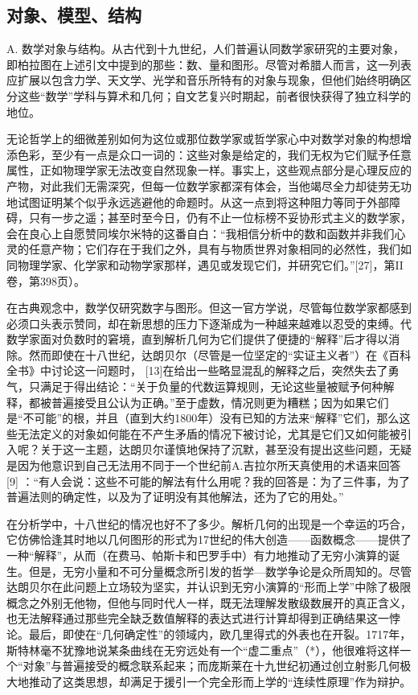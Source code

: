 \subsection*{对象、模型、结构}

A. 数学对象与结构。从古代到十九世纪，人们普遍认同数学家研究的主要对象，即柏拉图在上述引文中提到的那些：数、量和图形。尽管对希腊人而言，这一列表应扩展以包含力学、天文学、光学和音乐所特有的对象与现象，但他们始终明确区分这些“数学”学科与算术和几何；自文艺复兴时期起，前者很快获得了独立科学的地位。

无论哲学上的细微差别如何为这位或那位数学家或哲学家心中对数学对象的构想增添色彩，至少有一点是众口一词的：这些对象是给定的，我们无权为它们赋予任意属性，正如物理学家无法改变自然现象一样。事实上，这些观点部分是心理反应的产物，对此我们无需深究，但每一位数学家都深有体会，当他竭尽全力却徒劳无功地试图证明某个似乎永远逃避他的命题时。从这一点到将这种阻力等同于外部障碍，只有一步之遥；甚至时至今日，仍有不止一位标榜不妥协形式主义的数学家，会在良心上自愿赞同埃尔米特的这番自白：“我相信分析中的数和函数并非我们心灵的任意产物；它们存在于我们之外，具有与物质世界对象相同的必然性，我们如同物理学家、化学家和动物学家那样，遇见或发现它们，并研究它们。”{[}27{]}，第II卷，第398页）。

在古典观念中，数学仅研究数字与图形。但这一官方学说，尽管每位数学家都感到必须口头表示赞同，却在新思想的压力下逐渐成为一种越来越难以忍受的束缚。代数学家面对负数时的窘境，直到解析几何为它们提供了便捷的“解释”后才得以消除。然而即使在十八世纪，达朗贝尔（尽管是一位坚定的“实证主义者”）在《百科全书》中讨论这一问题时， {[}13{]}在给出一些略显混乱的解释之后，突然失去了勇气，只满足于得出结论：“关于负量的代数运算规则，无论这些量被赋予何种解释，都被普遍接受且公认为正确。”至于虚数，情况则更为糟糕；因为如果它们是“不可能”的根，并且（直到大约1800年）没有已知的方法来“解释”它们，那么这些无法定义的对象如何能在不产生矛盾的情况下被讨论，尤其是它们又如何能被引入呢？关于这一主题，达朗贝尔谨慎地保持了沉默，甚至没有提出这些问题，无疑是因为他意识到自己无法用不同于一个世纪前A.吉拉尔所天真使用的术语来回答 {[}9{]} ：“有人会说：这些不可能的解法有什么用呢？我的回答是：为了三件事，为了普遍法则的确定性，以及为了证明没有其他解法，还为了它的用处。”

在分析学中，十八世纪的情况也好不了多少。解析几何的出现是一个幸运的巧合，它仿佛恰逢其时地以几何图形的形式为17世纪的伟大创造——函数概念——提供了一种“解释”，从而（在费马、帕斯卡和巴罗手中）有力地推动了无穷小演算的诞生。但是，无穷小量和不可分量概念所引发的哲学—数学争论是众所周知的。尽管达朗贝尔在此问题上立场较为坚实，并认识到无穷小演算的“形而上学”中除了极限概念之外别无他物，但他与同时代人一样，既无法理解发散级数展开的真正含义，也无法解释通过那些完全缺乏数值解释的表达式进行计算却得到正确结果这一悖论。最后，即使在“几何确定性”的领域内，欧几里得式的外表也在开裂。1717年，斯特林毫不犹豫地说某条曲线在无穷远处有一个“虚二重点”（*），他很难将这样一个“对象”与普遍接受的概念联系起来；而庞斯莱在十九世纪初通过创立射影几何极大地推动了这类思想，却满足于援引一个完全形而上学的“连续性原理”作为辩护。

